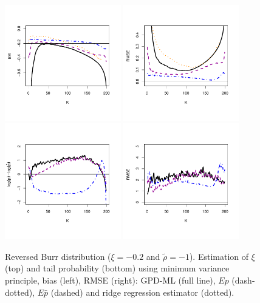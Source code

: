 \documentclass[twoside,leqno,11pt]{article}
\begin{document}
 

 \begin{figure}[!ht]
  \centering
\includegraphics[width=0.45\textwidth]{model3GPD_evi.pdf} 
\includegraphics[width=0.45\textwidth]{model3GPD_rmse.pdf} \\
\includegraphics[width=0.45\textwidth]{model3GPD_tail.pdf}
\includegraphics[width=0.45\textwidth]{model3GPD_tail_rmse.pdf}  
 \caption{ Reversed Burr distribution ($\xi=-0.2$ and $\tilde\rho=-1$). Estimation of $\xi$ (top) and tail probability (bottom) using minimum variance principle, bias (left), RMSE (right): GPD-ML (full line),  $Ep$ (dash-dotted), $E\bar{p}$ (dashed) and ridge regression estimator (dotted).}
\end{figure}
\end{document}
